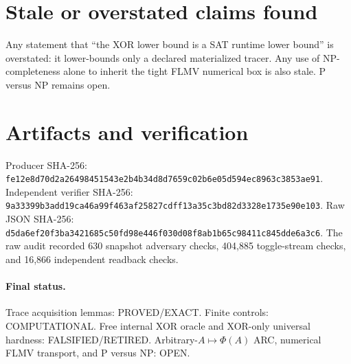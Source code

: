 \documentclass[11pt]{article}
\newcommand{\status}[1]{\textsf{#1}}
\begin{document}
\section{Stale or overstated claims found}
Any statement that ``the XOR lower bound is a SAT runtime lower bound'' is overstated: it lower-bounds only a declared materialized tracer.  Any use of NP-completeness alone to inherit the tight FLMV numerical box is also stale.  P versus NP remains open.

\section{Artifacts and verification}
Producer SHA-256: \texttt{fe12e8d70d2a26498451543e2b4b34d8d7659c02b6e05d594ec8963c3853ae91}.  Independent verifier SHA-256: \texttt{9a33399b3add19ca46a99f463af25827cdff13a35c3bd82d3328e1735e90e103}.  Raw JSON SHA-256: \texttt{d5da6ef20f3ba3421685c50fd98e446f030d08f8ab1b65c98411c845dde6a3c6}.  The raw audit recorded 630 snapshot adversary checks, 404,885 toggle-stream checks, and 16,866 independent readback checks.

\paragraph{Final status.}
Trace acquisition lemmas: \status{PROVED/EXACT}.  Finite controls: \status{COMPUTATIONAL}.  Free internal XOR oracle and XOR-only universal hardness: \status{FALSIFIED/RETIRED}.  Arbitrary-$A\mapsto\Phi(A)$ ARC, numerical FLMV transport, and P versus NP: \status{OPEN}.

\end{document}

